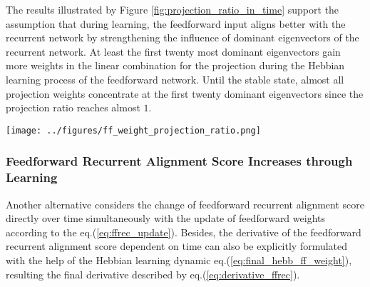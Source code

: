 \documentclass[11pt]{article}
\begin{document}
	The results illustrated by Figure \ref{fig:projection_ratio_in_time} support the assumption that during learning, the feedforward input aligns better with the recurrent network by strengthening the influence of dominant eigenvectors of the recurrent network. At least the first twenty most dominant eigenvectors gain more weights in the linear combination for the projection during the Hebbian learning process of the feedforward network. Until the stable state, almost all projection weights concentrate at the first twenty dominant eigenvectors since the projection ratio reaches almost $1$. %
	
		\begin{SCfigure}[0.9][h]
			\centering
			\texttt{[image: ../figures/ff\_weight\_projection\_ratio.png]}
			\caption[Time related development of projection ratio]{\textbf{Time related development of projection ratio.} Projection ratio defined by eq.(\ref{eq:projection_ratio}) quantifies the strength of linear dependency between feedforward weights and the first twenty most dominant eigenvectors of the recurrent network. With the time-dependent update of feedforward weights eq.(\ref{eq:euler_scheme_ffrec_weight}), the projection coefficients are also updated synchronously. Step width $\Delta t$ for the Euler scheme is $0.1$ over the total duration of $T=50$ time units. For statistics, $50$ repeats with different initial feedforward weights were implemented. The shadow indicates the 95\% confidence interval.}
			\label{fig:projection_ratio_in_time}
		\end{SCfigure}
	
	\subsubsection{Feedforward Recurrent Alignment Score Increases through Learning}
	
	Another alternative considers the change of feedforward recurrent alignment score directly over time simultaneously with the update of feedforward weights according to the eq.(\ref{eq:ffrec_update}). Besides, the derivative of the feedforward recurrent alignment score dependent on time can also be explicitly formulated with the help of the Hebbian learning dynamic eq.(\ref{eq:final_hebb_ff_weight}), resulting the final derivative described by eq.(\ref{eq:derivative_ffrec}). 
	
\end{document}

